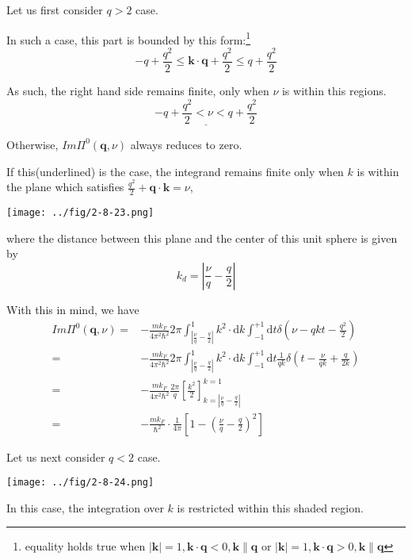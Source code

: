 Let us first consider $q>2$ case.

In such a case, this part is bounded by this form:\footnote{equality holds true when $|\mathbf{k}|=1,\mathbf{k}\cdot \mathbf{q} < 0, \mathbf{k} \parallel \mathbf{q}$ or $|\mathbf{k}|=1,\mathbf{k}\cdot \mathbf{q} > 0, \mathbf{k} \parallel \mathbf{q}$}
\[ -q + \frac{q^2}{2} \leq \mathbf{k}\cdot\mathbf{q}+\frac{q^2}{2} \leq q+ \frac{q^2}{2} \]

As such, the right hand side remains finite, only when $\nu$ is within this regions.
\[ \underline{-q + \frac{q^2}{2} < \nu < q + \frac{q^2}{2}} \]

Otherwise, $Im\Pi^0(\mathbf{q},\nu)$ always reduces to zero.

If this(underlined) is the case, the integrand remains finite only when $k$ is within the plane which satisfies $\frac{q^2}{2}+\mathbf{q}\cdot \mathbf{k} = \nu$,
\begin{center} \label{Fig2.8.23}
\texttt{[image: ../fig/2-8-23.png]}
\end{center}

where the distance between this plane and the center of this unit sphere is given by
\[ k_d = |\frac{\nu}{q} - \frac{q}{2}| \]

With this in mind, we have
\begin{equation} \label{Eqs2.8.21} \begin{split}
Im\Pi^0(\mathbf{q},\nu) =& -\frac{m k_F}{4\pi^2 \hbar^2} 2\pi \int_{|\frac{\nu}{q}-\frac{q}{2}|}^1 k^2 \cdot \mathrm{d}k \int_{-1}^{+1} \mathrm{d}t \delta(\nu-qkt -\frac{q^2}{2})\\
=& -\frac{m k_F}{4\pi^2 \hbar^2} 2\pi \int_{|\frac{\nu}{q}-\frac{q}{2}|}^1 k^2 \cdot \mathrm{d}k \int_{-1}^{+1} \mathrm{d}t \frac{1}{qk}\delta(t - \frac{\nu}{qk} + \frac{q}{2k})\\
=&-\frac{m k_F}{4\pi^2 \hbar^2} \frac{2\pi}{q} \left[ \frac{k^2}{2} \right]_{k=|\frac{\nu}{q}-\frac{q}{2}|}^{k=1}\\
=&-\frac{m k_F}{\hbar^2} \cdot \frac{1}{4\pi} \left[ 1-\left( \frac{\nu}{q}-\frac{q}{2} \right)^2 \right]
\end{split}\end{equation}

Let us next consider $q<2$ case.
\begin{center}\label{Fig2.8.24}
\texttt{[image: ../fig/2-8-24.png]}
\end{center}

In this case, the integration over $k$ is restricted within this shaded region.

